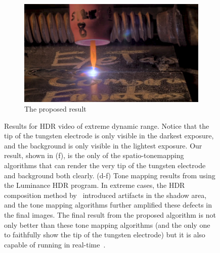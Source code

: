 \begin{figure}
\begin{subfigure}[b]{6.2in}
\centering
  \includegraphics[width=6.0in]{ch2/diagrams/frames/5stops/final_tm_result.jpg}
  \caption{The proposed result~\cite{lo2012high}}
  \label{fig:proposed_result}
\end{subfigure}
\caption{Results for HDR video of extreme dynamic range.
                 Notice that the tip of the tungsten electrode is only visible
                 in the darkest exposure, and the background is only visible
                 in the lightest exposure.
                 Our result, shown in (f), is the only of the spatio-tonemapping
                 algorithms that can render the very tip of the tungsten
                 electrode and background both clearly.
                 (d-f) Tone mapping results from 
\cite{mantiuk2006perceptual,fattal2002gradient,reinhard2002photographic} using the Luminance 
HDR program.
                 In extreme cases, the HDR composition method by~\cite{debevec2008recovering} 
introduced artifacts in the shadow area, and the tone mapping algorithms further amplified these 
defects in the final images.
                The final result from the proposed algorithm is not only better than these tone mapping algorithms (and the only one to 
faithfully show the tip of the tungsten electrode)
                but it is also capable of running in real-time~\cite{lo2012high}.}\label{fig:welding_results}
\end{figure}


